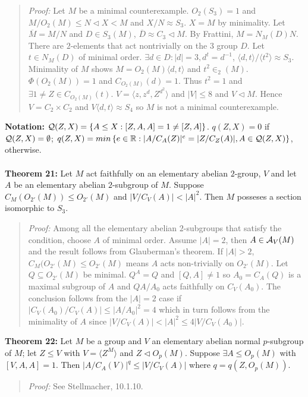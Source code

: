 \begin{quote}
\emph{Proof:}  
Let $M$ be a minimal counterexample.  $O_2(S_3)=1$ and $M/O_2(M) \leq N \lhd X < M$ and $X/N \approx S_3$.
$X=M$ by minimality.  Let ${\overline M}= M/N$ and $D \in S_3(M)$, ${\overline D} \approx C_3 \lhd M$.
By Frattini, $M= N_M(D) N$.  There are $2$-elements that act nontrivially on the $3$ group $D$.  Let $t \in N_M(D)$
of minimal order.  $\exists d \in D: |d|=3, d^t= d^{-1}$, $\langle d, t \rangle/\langle t^2 \rangle \approx S_3$.
Minimality of $M$ shows  $M= O_2(M) \langle d,t \rangle$ and $t^2 \in _2(M)$.
$\Phi(O_2(M))= 1$ and $C_{O_2(M)}(d)=1$.  Thus  $t^2=1$ and $\exists 1 \neq Z \in C_{O_2(M)}(t)$.
$V= \langle z, z^d, Z^{d^2} \rangle$ and $|V| \leq 8$ and $V \lhd M$.  Hence $V= C_2 \times C_2$ and
$V \langle d, t \rangle \approx S_4$ so $M$ is not a minimal counterexample.
\end{quote}
{\bf Notation:}
${\cal Q}(Z, X)= \{ A \leq X: [Z,A,A]=1 \neq [Z,A] \}$.
$q(Z,X)= 0$ if ${\cal Q}(Z,X)= \emptyset$;
$q(Z,X)= min \thinspace \{e \in {\mathbb R}: |A/C_A(Z)|^e= |Z/C_Z(A)|, A \in {\cal Q}(Z,X) \}$, otherwise.
\\
\\
{\bf Theorem 21:}
Let $M$ act faithfully on 
an elementary abelian $2$-group, $V$ and let
$A$ be an elementary abelian $2$-subgroup of $M$.  Suppose
$C_M(O_{2'}(M)) \leq O_{2'}(M)$ and $|V/C_V(A)| < |A|^2$.  Then
$M$ posseses a section isomorphic to $S_3$.
\begin{quote}
\emph{Proof:}  
Among all the elementary abelian $2$-subgroups that satisfy the condition, choose $A$ of minimal order.
Assume $|A|=2$, then $A \in {\cal A}_V(M)$ and the result follows from Glauberman's theorem.
If $|A|>2$,$C_M(O_{2'}(M) \leq O_{2'}(M)$ means $A$ acts non-trivially on $O_{2'}(M)$.  Let $Q \subseteq O_{2'}(M)$
be minimal.  $Q^A=Q$ and $[Q,A] \neq 1$ so $A_0= C_A(Q)$ is a maximal subgroup of $A$ and
$QA/A_0$ acts faithfully on $C_V(A_0)$.  The conclusion follows from the $|A|=2$ case if
$|C_V(A_0)/C_V(A)| \leq |A/A_0|^2=4$ which in turn follows from the minimality of $A$ since
$|V/C_V(A)| < |A|^2 \leq 4 |V/C_V(A_0)|$.
\end{quote}
{\bf Theorem 22:}
Let $M$ be a group and $V$ an elementary abelian normal $p$-subgroup of $M$; let $Z \leq V$ with
$V= \langle Z^M \rangle$ and $Z \lhd O_p(M)$.  Suppose $\exists A \leq O_p(M)$ with $[V,A,A]=1$.
Then $|A/C_A(V)|^q \leq |V/C_V(A)|$ where $q= q(Z,O_p(M))$.
\begin{quote}
\emph{Proof:}  
See Stellmacher, 10.1.10.
\end{quote}
